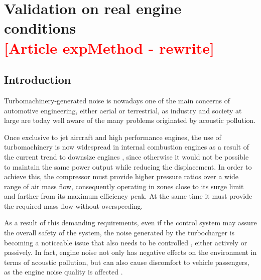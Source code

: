 \chapter{Validation on real engine conditions\\ \textcolor{red}{[Article expMethod - rewrite]}}
\label{cap:engine}


\noindent \section{Introduction}\label{sec:intro}
Turbomachinery-generated noise is nowadays one of the main concerns of automotive engineering, either aerial or terrestrial, as industry and society at large are today well aware of the many problems originated by acoustic pollution.

Once exclusive to jet aircraft and high performance engines, the use of turbomachinery is now widespread in internal combustion engines as a result of the current trend to downsize engines \cite{knecht2008diesel}, since otherwise it would not be possible to maintain the same power output while reducing the displacement. In order to achieve this, the compressor must provide higher pressure ratios over a wide range of air mass flow, consequently operating in zones close to its surge limit \cite{galindo2008experiments} and farther from its maximum efficiency peak. At the same time it must provide the required mass flow without overspeeding.

As a result of this demanding requirements, even if the control system may assure the overall safety of the system, the noise generated by the turbocharger is becoming a noticeable issue that also needs to be controlled \cite{gonzalez2003sound}, either actively or passively. In fact, engine noise not only has negative effects on the environment in terms of acoustic pollution, but can also cause discomfort to vehicle passengers, as the engine noise quality is affected \cite{brizon2012combining,nor2008index}.

